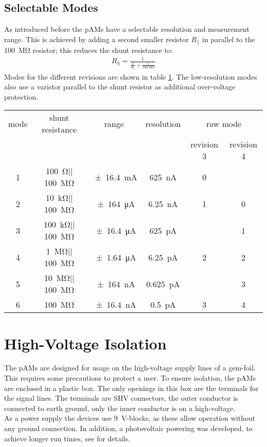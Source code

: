 \subsection*{Selectable Modes}
As introduced before the \acp{pAM} have a selectable resolution and measurement range. This is achieved by adding a second smaller resistor $R_\text{||}$ in parallel to the \SI{100}{\mega\ohm} resistor; this reduces the shunt resistance to:
\begin{align}
	R_\text{S}=\frac{1}{\frac{1}{R_{||}}+\frac{1}{\SI{100}{\mega\ohm}}}
\end{align} 
Modes for the different revisions are shown in table \ref{tab:frontend:old:modes}. The low-resolution modes also use a varistor parallel to the shunt resistor as additional over-voltage protection.
\begin{table}
	\centering
	\begin{tabular}{cccccc}
		\hline
		mode & shunt resistance & range & resolution & \multicolumn{2}{c}{raw mode} \\
		 & 						 & & 		& revision 3 & revision 4 \\
		\hline
		1 & \SI{100}{\ohm}$||$\SI{100}{\mega\ohm} & \SI{\pm16.4}{\milli\ampere} & \SI{625}{\nano\ampere} & 0 & \\
		2 & \SI{10}{\kilo\ohm}$||$\SI{100}{\mega\ohm} & \SI{\pm164}{\micro\ampere} & \SI{6.25}{\nano\ampere} & 1 & 0 \\
		3 & \SI{100}{\kilo\ohm}$||$\SI{100}{\mega\ohm} & \SI{\pm16.4}{\micro\ampere} & \SI{625}{\pico\ampere} & & 1 \\
		4 & \SI{1}{\mega\ohm}$||$\SI{100}{\mega\ohm} & \SI{\pm1.64}{\micro\ampere} & \SI{6.25}{\pico\ampere} & 2 & 2 \\
		5 & \SI{10}{\mega\ohm}$||$\SI{100}{\mega\ohm} & \SI{\pm164}{\nano\ampere} & \SI{0.625}{\pico\ampere} & & 3 \\
		6 & \SI{100}{\mega\ohm} & \SI{\pm16.4}{\nano\ampere} & \SI{0.5}{\pico\ampere} & 3 & 4 \\
		\hline
	\end{tabular}
	\label{tab:frontend:old:modes}
\end{table}
\section{High-Voltage Isolation}
The \acp{pAM} are designed for usage on the high-voltage supply lines of a \ac{gem}-foil. This requires some precautions to protect a user. To ensure isolation, the \acp{pAM} are enclosed in a plastic box. The only openings in this box are the terminals for the signal lines. The terminals are SHV connectors, the outer conductor is connected to earth ground, only the inner conductor is on a high-voltage. \\
As a power supply the devices use \SI{9}{\volt}-blocks, as these allow operation without any ground connection. In addition, a photovoltaic powering was developed, to achieve longer run times, see \cite{rudolph} for details.
